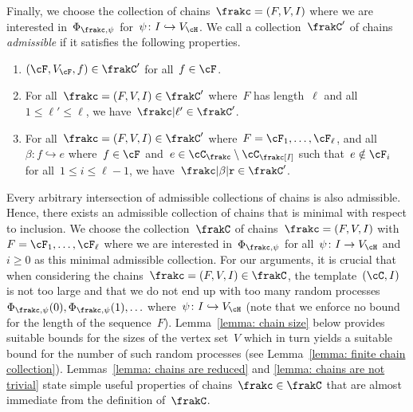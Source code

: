 \documentclass[11pt]{amsart}
\newcommand{\injection}{\hookrightarrow}
\newcommand{\R}{\text{\normalfont\ttfamily r}}
\theoremstyle{definition}
\numberwithin{equation}{section}
\begin{document}
	Finally, we choose the collection of chains~$\frakc=(F,V,I)$ where we are interested in~$\Phi_{\frakc,\psi}$ for~$\psi\colon I\injection V_\cH$.
	We call a collection~$\frakC'$ of chains \emph{admissible} if it satisfies the following properties.
	\begin{enumerate}[label=(\roman*)]
		\item $(\cF,V_\cF,f)\in\frakC'$ for all~$f\in\cF$.
		\item For all~$\frakc=(F,V,I)\in \frakC'$ where~$F$ has length~$\ell$ and all~$1\leq\ell'\leq\ell$, we have~$\frakc|\ell'\in\frakC'$.
		\item For all~$\frakc=(F,V,I)\in \frakC'$ where~$F=\cF_1,\ldots,\cF_\ell$, and all~$\beta\colon f\injection e$ where~$f\in\cF$ and~$e\in\cC_{\frakc}\setminus\cC_\frakc[I]$ such that~$e\notin \cF_i$ for all~$1\leq i\leq \ell-1$, we have~$\frakc|\beta|\R\in\frakC'$.
	\end{enumerate}
	Every arbitrary intersection of admissible collections of chains is also admissible.
	Hence, there exists an admissible collection of chains that is minimal with respect to inclusion.
	We choose the collection~$\frakC$ of chains~$\frakc=(F,V,I)$ with~$F=\cF_1,\ldots,\cF_\ell$ where we are interested in~$\Phi_{\frakc,\psi}$ for all~$\psi\colon I\rightarrow V_\cH$ and~$i\geq 0$ as this minimal admissible collection.
	For our arguments, it is crucial that when considering the chains~$\frakc=(F,V,I)\in\frakC$, the template~$(\cC,I)$ is not too large and that we do not end up with too many random processes~$\Phi_{\frakc,\psi}(0),\Phi_{\frakc,\psi}(1),\ldots$ where~$\psi\colon I\injection V_\cH$ (note that we enforce no bound for the length of the sequence~$F$).
	Lemma~\ref{lemma: chain size} below provides suitable bounds for the sizes of the vertex set~$V$ which in turn yields a suitable bound for the number of such random processes (see Lemma~\ref{lemma: finite chain collection}).
	Lemmas~\ref{lemma: chains are reduced} and \ref{lemma: chains are not trivial} state simple useful properties of chains~$\frakc\in\frakC$ that are almost immediate from the definition of~$\frakC$.
	
	
	
	
	
\end{document}
